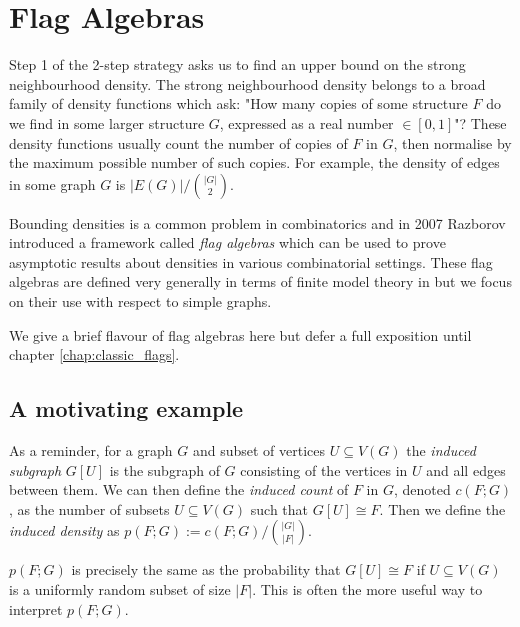 \section*{Flag Algebras}

Step 1 of the 2-step strategy
asks us to find an upper bound on the strong neighbourhood density. The strong neighbourhood
density belongs to a broad family of density functions which ask: "How many copies of some
structure $F$ do we find in some larger structure $G$, expressed as a real number $\in [0,1]$"?
These density functions usually count the number of copies of $F$ in $G$, then normalise by the
maximum possible number of such copies.
For example, the density of edges in some graph $G$ is $|E(G)|/\binom{|G|}{2}$.

Bounding densities
is a common problem in combinatorics and in 2007 Razborov \cite{razborovFlagAlgebras2007}
introduced a framework called \textit{flag algebras}
which can be used to prove asymptotic results about densities in various combinatorial settings.
These flag algebras are defined very generally in terms of finite model theory in \cite{razborovFlagAlgebras2007} but we focus on their use with respect to simple graphs.

We give a brief flavour of flag algebras here but defer a full exposition until
chapter \ref{chap:classic_flags}.

\subsection*{A motivating example}
\label{sec:motivating_example}

As a reminder, for a graph $G$ and subset of vertices $U\subseteq V(G)$ the \textit{induced subgraph}
$G[U]$ is the subgraph of $G$ consisting of the vertices in $U$ and all edges between them.
We can then define the \textit{induced count} of $F$ in $G$, denoted $c(F; G)$, as
the number of subsets $U\subseteq V(G)$ such that $G[U] \cong F$. Then we define the
\textit{induced density} as $p(F; G) := c(F; G) / \binom{|G|}{|F|}$.

\begin{note*}
    $p(F; G)$ is precisely the same as the probability that $G[U] \cong F$ if
    $U \subseteq V(G)$ is a uniformly random subset of size $|F|$. This is often
    the more useful way to interpret $p(F;G)$.
\end{note*}

